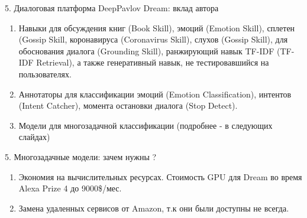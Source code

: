 \begin{frame}{5. Диалоговая платформа DeepPavlov Dream: вклад автора}
\begin{enumerate}
 \item Навыки для обсуждения книг (Book Skill), эмоций (Emotion Skill), сплетен (Gossip Skill, коронавируса (Coronavirus Skill), слухов (Gossip Skill), для обоснования диалога (Grounding Skill), ранжирующий навык TF-IDF (TF-IDF Retrieval), а также генеративный навык, не тестировавшийся на пользователях.
 \item Аннотаторы для классификации эмоций (Emotion Classification), интентов (Intent Catcher), момента остановки диалога (Stop Detect).
 \item Модели для многозадачной классификации (подробнее - в следующих слайдах)
\end{enumerate}
\end{frame}
\begin{frame}{5. Многозадачные модели: зачем нужны ?}
\begin{enumerate}
\item Экономия на вычислительных ресурсах. Стоимость GPU для Dream во время Alexa Prize 4 до 9000\$/мес.
\item Замена удаленных сервисов от Amazon, т.к они были доступны не всегда.
\end{enumerate}
\end{frame}

